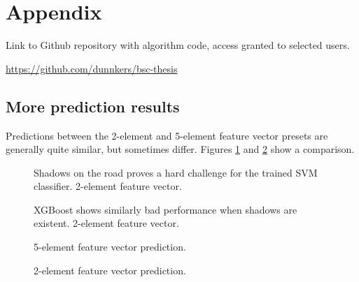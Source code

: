 
\section{Appendix}\label{ap:appendix}
Link to Github repository with algorithm code, access granted to selected users.

\url{https://github.com/dunnkers/bsc-thesis}

\subsection{More prediction results}
Predictions between the 2-element and 5-element feature vector presets are generally quite similar, but sometimes differ. Figures \ref{fig:appendix_5-elem-fv} and \ref{fig:appendix_2-elem-fv} show a comparison.

\begin{figure}[ht]
  \centering
  
    \caption{Shadows on the road proves a hard challenge for the trained SVM classifier. 2-element feature vector.
  }
\end{figure}

\begin{figure}[ht]
  \centering
  
    \caption{XGBoost shows similarly bad performance when shadows are existent. 2-element feature vector.
  }
\end{figure}

\begin{figure}[ht]
  \centering
  
    \caption{5-element feature vector prediction.
  }\label{fig:appendix_5-elem-fv}
\end{figure}

\begin{figure}[ht]
  \centering
  
    \caption{2-element feature vector prediction.
  }\label{fig:appendix_2-elem-fv}
\end{figure}

\begin{figure}[ht]
  \centering
  
\end{figure}


